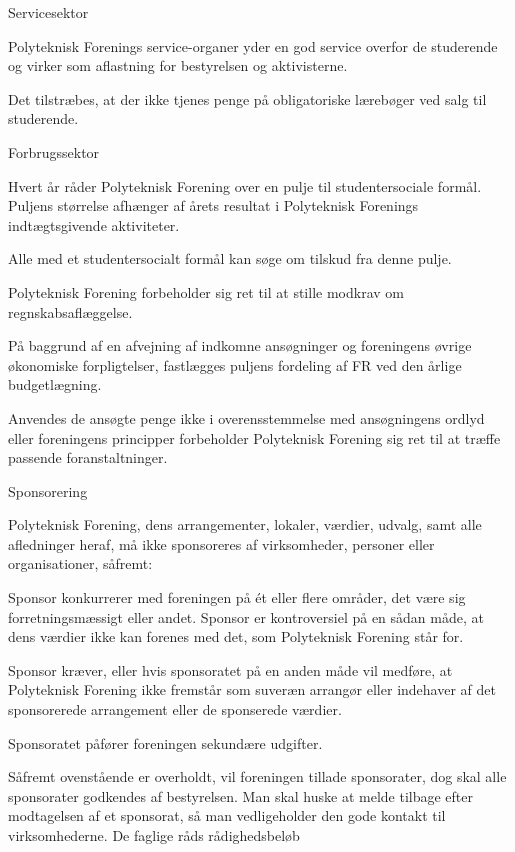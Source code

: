 Servicesektor
\begin{list}{•}
\item Polyteknisk Forenings service-organer yder en god service overfor de studerende og virker som aflastning for
bestyrelsen og aktivisterne.
\item Det tilstræbes, at der ikke tjenes penge på obligatoriske lærebøger ved salg til studerende.
\end{list}
Forbrugssektor
\begin{list}{•}
 \item  Hvert år råder Polyteknisk Forening over en pulje til studentersociale formål. Puljens størrelse afhænger af årets resultat i Polyteknisk Forenings indtægtsgivende aktiviteter.
\item Alle med et studentersocialt formål kan søge om tilskud fra denne pulje.
\item Polyteknisk Forening forbeholder sig ret til at stille modkrav om regnskabsaflæggelse.
\item På baggrund af en afvejning af indkomne ansøgninger og foreningens øvrige økonomiske forpligtelser, fastlægges puljens fordeling af FR ved den årlige budgetlægning.
\item Anvendes de ansøgte penge ikke i overensstemmelse med ansøgningens ordlyd eller foreningens principper forbeholder Polyteknisk Forening sig ret til at træffe passende foranstaltninger.
\end{list}


Sponsorering

Polyteknisk Forening, dens arrangementer, lokaler, værdier, udvalg, samt alle afledninger heraf, må ikke sponsoreres af
virksomheder, personer eller organisationer, såfremt:
\begin{list}{•}
\item Sponsor konkurrerer med foreningen på ét eller flere områder, det være sig forretningsmæssigt eller andet.
Sponsor er kontroversiel på en sådan måde, at dens værdier ikke kan forenes med det, som Polyteknisk
Forening står for.
\item Sponsor kræver, eller hvis sponsoratet på en anden måde vil medføre, at Polyteknisk Forening ikke fremstår
som suveræn arrangør eller indehaver af det sponsorerede arrangement eller de sponserede værdier.
\item Sponsoratet påfører foreningen sekundære udgifter.
\end{list}
Såfremt ovenstående er overholdt, vil foreningen tillade sponsorater, dog skal alle sponsorater godkendes af bestyrelsen.
Man skal huske at melde tilbage efter modtagelsen af et sponsorat, så man vedligeholder den gode kontakt til
virksomhederne.
De faglige råds rådighedsbeløb


